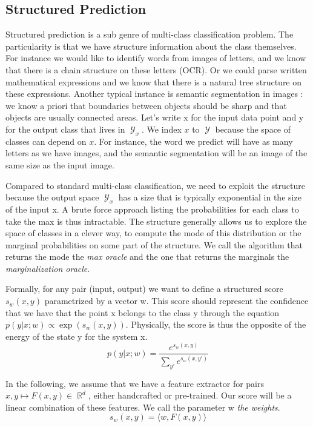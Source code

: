 \documentclass{article}
\DeclareMathOperator{\R}{\mathbb{R}}
\DeclareMathOperator{\1}{\mathbb{1}}
\DeclareMathOperator{\Y}{\mathcal{Y}}
\begin{document}
\subsection{Structured Prediction}

Structured prediction is a sub genre of multi-class classification problem.
The particularity is that we have structure information about the class themselves.
For instance we would like to identify words from images of letters, and we know that there is a chain structure on these letters (OCR).
Or we could parse written mathematical expressions and we know that there is a natural tree structure on these expressions.
Another typical instance is semantic segmentation in images : we know a priori that boundaries between objects should be sharp and that objects are usually connected areas.
Let's write x for the input data point and y for the output class that lives in $\Y_x$.
We index $x$ to $\Y$ because the space of classes can depend on $x$.
For instance, the word we predict will have as many letters as we have images, and the semantic segmentation will be an image of the same size as the input image. 

Compared to standard multi-class classification, we need to exploit the structure because the output space $\Y_x$ has a size that is typically exponential in the size of the input x.
A brute force approach listing the probabilities for each class to take the max is thus intractable.
The structure generally allows us to explore the space of classes in a clever way, to compute the mode of this distribution or the marginal probabilities on some part of the structure.
We call the algorithm that returns the mode the \textit{max oracle} and the one that returns the marginals the \textit{marginalization oracle}. 

Formally, for any pair (input, output) we want to define a structured score $s_w(x, y)$ parametrized by a vector w.
This score should represent the confidence that we have that the point x belongs to the class y through the equation $p(y|x ; w)\propto \exp(s_w(x, y))$.
Physically, the score  is thus the opposite of the energy of the state y for the system x. 
\begin{equation}
	p(y|x; w)=  \frac{e^{s_w(x, y)}}{\sum_{y'} e^{s_w(x, y')}}
\end{equation}

In the following, we assume that we have a feature extractor for pairs $x, y \mapsto F(x, y) \in \R^d$, either handcrafted or pre-trained.
Our score will be a linear combination of these features.
We call the parameter w \textit{the weights}.
\begin{equation}
	s_w(x, y) = \langle w, F(x, y) \rangle
\end{equation}
\end{document}
